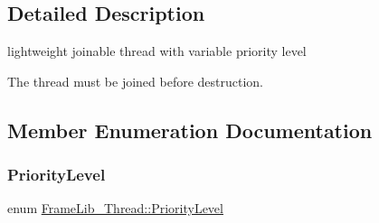 \subsection{Detailed Description}
lightweight joinable thread with variable priority level 

The thread must be joined before destruction. 

\subsection{Member Enumeration Documentation}
\mbox{\label{class_frame_lib___thread_a99a5e56edcadf37e3388f5557e8ec7ed}} 
\subsubsection{\texorpdfstring{Priority\+Level}{PriorityLevel}}
{\footnotesize\ttfamily enum \hyperlink{class_frame_lib___thread_a99a5e56edcadf37e3388f5557e8ec7ed}{Frame\+Lib\+\_\+\+Thread\+::\+Priority\+Level}}


